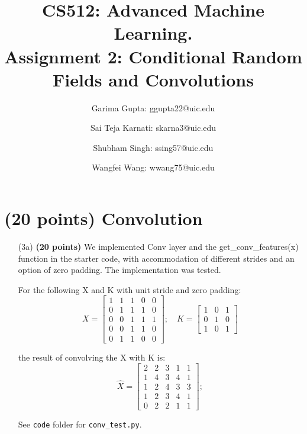 \documentclass[11pt]{report}
\begin{document}
\title{
  CS512: Advanced Machine Learning. \\
  \large Assignment 2: Conditional Random Fields and Convolutions}

\author{Garima Gupta: ggupta22@uic.edu \and Sai Teja Karnati: skarna3@uic.edu \and
 Shubham Singh: ssing57@uic.edu \and Wangfei Wang: wwang75@uic.edu}

\graphicspath{{./}{./Figures/}}

\maketitle

\section{(20 points) Convolution}


\begin{itemize}
\item[(3a)] \textbf{(20 points)} 
We implemented Conv layer and the get\_conv\_features(x) function in the starter code, with accommodation of different strides and an option of zero padding. 
The implementation was tested.

For the following X and K with unit stride and zero padding: 
%
\[
X = \begin{bmatrix}
1 & 1 & 1 & 0 & 0 \\
0 & 1 & 1 & 1 & 0\\
0 & 0 & 1 & 1 & 1\\
0 & 0 & 1 & 1 & 0\\
0 & 1 & 1 & 0 & 0
\end{bmatrix} ; \quad
K = \begin{bmatrix}
1 & 0 & 1 \\
0 & 1 & 0 \\
1 & 0 & 1
\end{bmatrix}
\]

the result of convolving the X with K is: 
\[
\hat{X} = \begin{bmatrix}
2 & 2 & 3 & 1 & 1 \\
1 & 4 & 3 & 4 & 1\\
1 & 2 & 4 & 3 & 3\\
1 & 2 & 3 & 4 & 1\\
0 & 2 & 2 & 1 & 1
\end{bmatrix};
\]

See {\tt code} folder for {\tt conv\_test.py}. 
\end{itemize}
\end{document}

